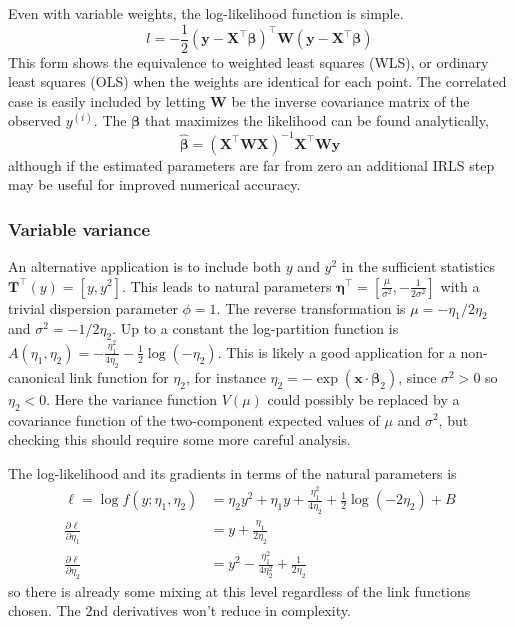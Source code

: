\documentclass{article}
\newcommand{\bbeta}{\boldsymbol{\beta}}
\begin{document}
Even with variable weights, the log-likelihood function is simple.
\[ l = -\frac{1}{2} (\mathbf{y} - \mathbf{X}^\intercal
\bbeta)^\intercal \mathbf{W} (\mathbf{y} - \mathbf{X}^\intercal
\bbeta) \]
This form shows the equivalence to weighted least squares (WLS), or ordinary
least squares (OLS) when the weights are identical for each point.
The correlated case is easily included by letting \(\mathbf{W}\) be the
inverse covariance matrix of the observed \(y^{(i)}\). The
\(\bbeta\) that maximizes the likelihood can be found
analytically,
\[ \hat{\bbeta} = (\mathbf{X}^\intercal \mathbf{W} \mathbf{X})^{-1}
\mathbf{X}^\intercal \mathbf{W} \mathbf{y} \]
although if the estimated parameters are far from zero an additional IRLS step
may be useful for improved numerical accuracy.

\subsubsection{Variable variance}

An alternative application is to include both \(y\) and \(y^2\) in the
sufficient statistics \(\mathbf{T}^\intercal(y) = [y, y^2]\). This leads to
natural parameters \(\boldsymbol{\eta}^\intercal = \left[ \frac{\mu}{\sigma^2},
-\frac{1}{2\sigma^2} \right] \) with a trivial dispersion parameter \(\phi =
1\). The reverse transformation is \(\mu = -\eta_1/2\eta_2\) and \(\sigma^2 =
-1/2\eta_2\). Up to a constant the log-partition function is \(A(\eta_1,
\eta_2) = -\frac{\eta_1^2}{4\eta_2} - \frac{1}{2}\log (-\eta_2) \).
This is likely a good application for a non-canonical link function for
\(\eta_2\), for instance \(\eta_2 = - \exp(\mathbf{x}\cdot\bbeta_2)\), since
\(\sigma^2 > 0\) so \(\eta_2 < 0\). Here the variance function \(V(\mu)\) could
possibly be replaced by a covariance function of the two-component expected
values of \(\mu\) and \(\sigma^2\), but checking this should require some more
careful analysis. 

The log-likelihood and its gradients in terms of the natural parameters is
\begin{align}
  \ell = \log f(y; \eta_1, \eta_2) &= \eta_2 y^2 + \eta_1 y + \frac{\eta_1^2}{4\eta_2} + \frac{1}{2} \log (-2\eta_2) + B \\
  \frac{\partial \ell}{\partial \eta_1} &= y + \frac{\eta_1}{2\eta_2} \\
  \frac{\partial \ell}{\partial \eta_2} &= y^2 - \frac{\eta_1^2}{4\eta_2^2} + \frac{1}{2\eta_2}
\end{align}
so there is already some mixing at this level regardless of the link functions
chosen. The 2nd derivatives won't reduce in complexity.
\end{document}
